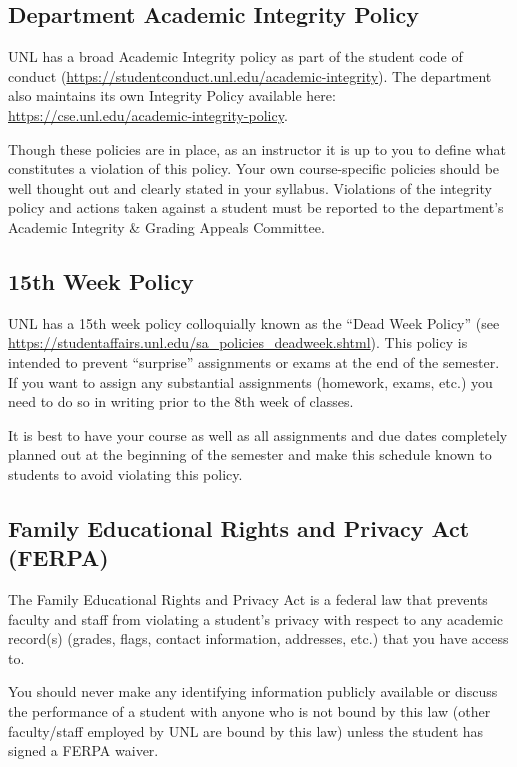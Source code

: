 \documentclass[12pt]{scrartcl}
\begin{document}
\subsection{Department Academic Integrity Policy}

UNL has a broad Academic Integrity policy as part of the
student code of conduct (\url{https://studentconduct.unl.edu/academic-integrity}).  The department also maintains its own Integrity
Policy available here: \url{https://cse.unl.edu/academic-integrity-policy}.

Though these policies are in place, as an instructor it is up
to you to define what constitutes a violation of this policy.
Your own course-specific policies should be well thought out and
clearly stated in your syllabus.  Violations of the integrity
policy and actions taken against a student must be reported to
the department's Academic Integrity \& Grading Appeals Committee.

\subsection{15th Week Policy}

UNL has a 15th week policy colloquially known as the ``Dead Week
Policy'' (see \url{https://studentaffairs.unl.edu/sa_policies_deadweek.shtml}).  This policy is intended to prevent
``surprise'' assignments or exams at the end of the semester.
If you want to assign any substantial assignments (homework, 
exams, etc.) you need to do so in writing prior to the 8th week
of classes.  

It is best to have your course as well as all assignments and
due dates completely planned out at the beginning of the semester
and make this schedule known to students to avoid violating this
policy.  

\subsection{Family Educational Rights and Privacy Act (FERPA)}

The Family Educational Rights and Privacy Act is a federal law
that prevents faculty and staff from violating a student's privacy
with respect to any academic record(s) (grades, flags, contact
information, addresses, etc.) that you have access to.  

You should never make any identifying information publicly available
or discuss the performance of a student with anyone who is 
not bound by this law (other faculty/staff employed by UNL are
bound by this law) unless the student has signed a FERPA waiver.
\end{document}
